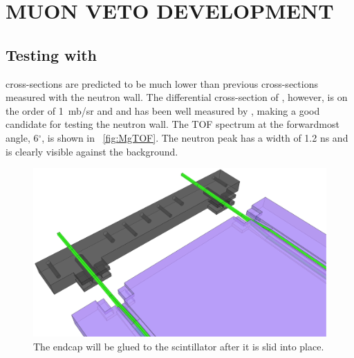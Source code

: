 %
%
%
%
%
%
%
%

%
%

\chapter{MUON VETO DEVELOPMENT}
\label{chap:muVeto}

\section{Testing with \MgReaction}

\GeTargets cross-sections are predicted to be much lower than previous cross-sections measured with the neutron wall.  The differential cross-section of \MgReaction, however, is on the order of 1~mb/sr and and has been well measured by \cite{Bohne_Mg}, making  a good candidate for testing the neutron wall.  The TOF spectrum at the forwardmost angle, 6$^{\circ}$, is shown in {\fig}~\ref{fig:MgTOF}.  The neutron peak has a width of 1.2 ns and is clearly visible against the background. 
\begin{figure}[htp]
\centering
\includegraphics[width=1.0\textwidth]{figures/veto_assembly.eps}
\caption{The endcap will be glued to the scintillator after it is slid into place.}
\label{fig:paddleAssembly}
\end{figure}


